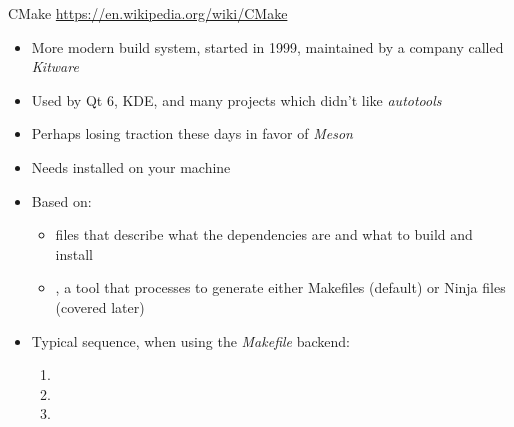 \begin{frame}{CMake}
  \url{https://en.wikipedia.org/wiki/CMake}
  \begin{itemize}
  \item More modern build system, started in 1999, maintained by a
    company called {\em Kitware}
  \item Used by Qt 6, KDE, and many projects which didn't like {\em
      autotools}
  \item Perhaps losing traction these days in favor of {\em Meson}
  \item Needs  installed on your machine
  \item Based on:
    \begin{itemize}
    \item {} files that describe what the
      dependencies are and what to build and install
    \item {}, a tool that processes  to
      generate either Makefiles (default) or Ninja files (covered later)
    \end{itemize}
  \item Typical sequence, when using the {\em Makefile} backend:
    \begin{enumerate}
    \item {}
    \item {}
    \item {}
    \end{enumerate}
  \end{itemize}
\end{frame}

